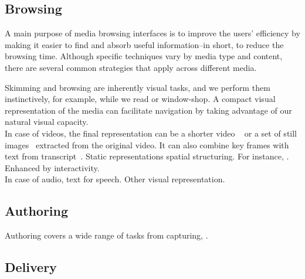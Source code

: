 \subsection{Browsing}
A main purpose of media browsing interfaces is to improve the users' efficiency by making it easier to find and absorb useful information--in short, to reduce the browsing time. Although specific techniques vary by media type and content, there are several common strategies that apply across different media. 
\begin{mldescription}
 Skimming and browsing are inherently visual tasks, and we perform them instinctively, for example, while we read or window-shop. A compact visual representation of the media can facilitate navigation by taking advantage of our natural visual capacity. \\
In case of videos, the final representation can be a shorter video ~\cite{he1999auto,ekin2003automatic,ngo2005video,lu2013story} or a set of still images~\cite{uchihashi1999video,barnes2010video,hwang2006cinema,boreczky2000interactive} extracted from the original video. It can also combine key frames with text from transcript~\cite{christel2002collages,pickering2003anses}. Static representations spatial structuring. For instance, . Enhanced by interactivity. \\
In case of audio, text for speech. Other visual representation. 
\end{mldescription}


\subsection{Authoring}
Authoring covers a wide range of tasks from capturing, . 

\subsection{Delivery}


 

